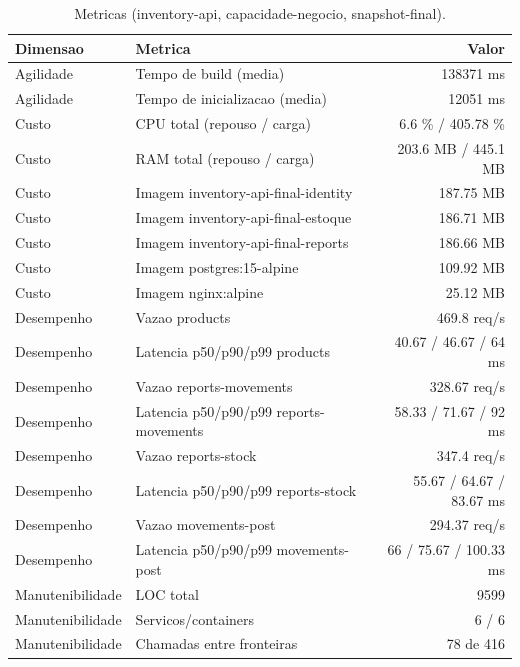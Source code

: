 \begin{table}[htb]
  \centering
  \caption{Metricas (inventory-api, capacidade-negocio, snapshot-final).}
  \label{tab:metricas-inventory-api-capacidade-negocio-snapshot-final}
  \begin{tabular}{llr}
    \hline
    \textbf{Dimensao} & \textbf{Metrica} & \textbf{Valor} \\
    \hline
    Agilidade & Tempo de build (media) & 138371 ms \\
    Agilidade & Tempo de inicializacao (media) & 12051 ms \\
    Custo & CPU total (repouso / carga) & 6.6 \% / 405.78 \% \\
    Custo & RAM total (repouso / carga) & 203.6 MB / 445.1 MB \\
    Custo & Imagem inventory-api-final-identity & 187.75 MB \\
    Custo & Imagem inventory-api-final-estoque & 186.71 MB \\
    Custo & Imagem inventory-api-final-reports & 186.66 MB \\
    Custo & Imagem postgres:15-alpine & 109.92 MB \\
    Custo & Imagem nginx:alpine & 25.12 MB \\
    Desempenho & Vazao products & 469.8 req/s \\
    Desempenho & Latencia p50/p90/p99 products & 40.67 / 46.67 / 64 ms \\
    Desempenho & Vazao reports-movements & 328.67 req/s \\
    Desempenho & Latencia p50/p90/p99 reports-movements & 58.33 / 71.67 / 92 ms \\
    Desempenho & Vazao reports-stock & 347.4 req/s \\
    Desempenho & Latencia p50/p90/p99 reports-stock & 55.67 / 64.67 / 83.67 ms \\
    Desempenho & Vazao movements-post & 294.37 req/s \\
    Desempenho & Latencia p50/p90/p99 movements-post & 66 / 75.67 / 100.33 ms \\
    Manutenibilidade & LOC total & 9599 \\
    Manutenibilidade & Servicos/containers & 6 / 6 \\
    Manutenibilidade & Chamadas entre fronteiras & 78 de 416 \\
    \hline
  \end{tabular}
\end{table}
